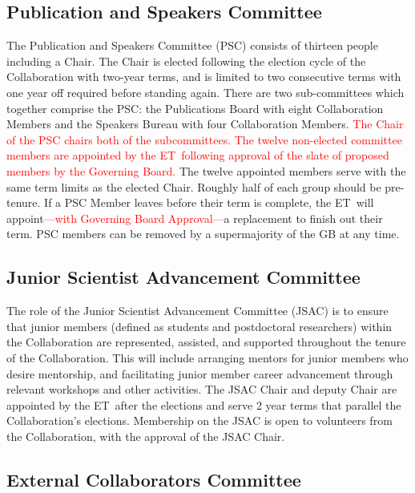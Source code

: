 \documentclass[12pt]{article}
\newcommand{\exec}{{Executive Team}}
\newcommand{\shorte}{{ET}}  %
\begin{document}
\subsection{Publication and Speakers  Committee}
\label{sec:pubcouncil}
The Publication and Speakers Committee (PSC) consists of thirteen people including a Chair. The Chair is elected following the election cycle of the Collaboration with  two-year terms, and is limited to two consecutive terms with one year off required before standing again. There are two sub-committees which together comprise the PSC: the Publications Board with eight Collaboration Members and the Speakers Bureau with four Collaboration Members. \textcolor{red}{The Chair of the PSC chairs both of the subcommittees.} \textcolor{red}{The twelve non-elected committee members are appointed by the \shorte\ following approval of the slate of proposed members by the Governing Board.} The twelve appointed members serve with the same term limits as the elected Chair.  Roughly half of each group should be pre-tenure. If a PSC Member leaves before their term is complete, the \shorte\ will appoint\textcolor{red}{---with Governing Board Approval---}a replacement to finish out their term.  PSC members can be removed by a supermajority of the GB at any time.  
 




\subsection{Junior Scientist Advancement Committee}

The role of the Junior Scientist Advancement Committee (JSAC) is to ensure that junior members (defined as students and postdoctoral researchers) within the Collaboration are represented, assisted, and supported throughout the  tenure of the Collaboration. This will include arranging mentors for junior members who desire mentorship, and facilitating junior member career advancement through relevant workshops and other activities. The JSAC Chair and deputy Chair are appointed by the \shorte\ after the elections and serve 2 year terms that parallel the Collaboration's elections. Membership on the JSAC is open to volunteers from the Collaboration, with the approval of the JSAC Chair. 


\subsection{External Collaborators Committee}
\end{document}
